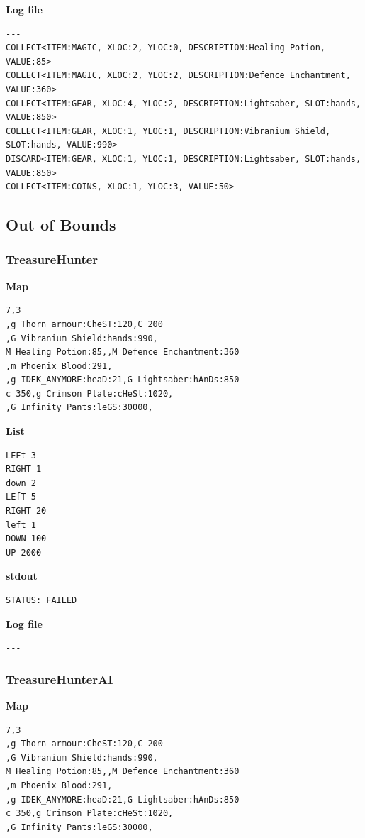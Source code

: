 \documentclass{article}
\begin{document}
\textbf{Log file}
\begin{lstlisting}
---
COLLECT<ITEM:MAGIC, XLOC:2, YLOC:0, DESCRIPTION:Healing Potion, VALUE:85>
COLLECT<ITEM:MAGIC, XLOC:2, YLOC:2, DESCRIPTION:Defence Enchantment, VALUE:360>
COLLECT<ITEM:GEAR, XLOC:4, YLOC:2, DESCRIPTION:Lightsaber, SLOT:hands, VALUE:850>
COLLECT<ITEM:GEAR, XLOC:1, YLOC:1, DESCRIPTION:Vibranium Shield, SLOT:hands, VALUE:990>
DISCARD<ITEM:GEAR, XLOC:1, YLOC:1, DESCRIPTION:Lightsaber, SLOT:hands, VALUE:850>
COLLECT<ITEM:COINS, XLOC:1, YLOC:3, VALUE:50>
\end{lstlisting}

\subsection{Out of Bounds}
\subsubsection{TreasureHunter}
\quad \textbf{Map}
\begin{lstlisting}
7,3
,g Thorn armour:CheST:120,C 200
,G Vibranium Shield:hands:990,
M Healing Potion:85,,M Defence Enchantment:360
,m Phoenix Blood:291,
,g IDEK_ANYMORE:heaD:21,G Lightsaber:hAnDs:850
c 350,g Crimson Plate:cHeSt:1020,
,G Infinity Pants:leGS:30000,
\end{lstlisting}

\textbf{List}
\begin{lstlisting}
LEFt 3
RIGHT 1
down 2
LEfT 5
RIGHT 20
left 1
DOWN 100
UP 2000
\end{lstlisting}
\pagebreak

\textbf{stdout}
\begin{lstlisting}
STATUS: FAILED
\end{lstlisting}

\textbf{Log file}
\begin{lstlisting}
---
\end{lstlisting}

\subsubsection{TreasureHunterAI}
\quad \textbf{Map}
\begin{lstlisting}
7,3
,g Thorn armour:CheST:120,C 200
,G Vibranium Shield:hands:990,
M Healing Potion:85,,M Defence Enchantment:360
,m Phoenix Blood:291,
,g IDEK_ANYMORE:heaD:21,G Lightsaber:hAnDs:850
c 350,g Crimson Plate:cHeSt:1020,
,G Infinity Pants:leGS:30000,
\end{lstlisting}
\end{document}

